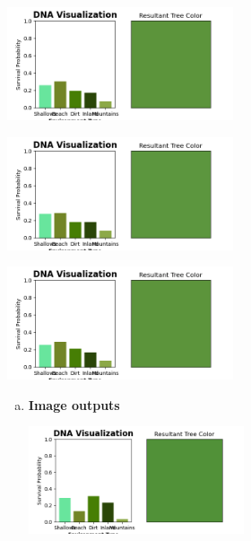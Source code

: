 \documentclass[11pt]{article}
\begin{document}

\begin{problems}
    \item \begin{problem}

        \begin{center}
        \includegraphics[width=0.5\textwidth]{outputs/q2a_frame0.png}
        
        \includegraphics[width=0.5\textwidth]{outputs/q2a_frame15.png}
        
        \includegraphics[width=0.5\textwidth]{outputs/q2a_frame29.png}
        \end{center}
    \end{problem}
    \clearpage

    
    \item \begin{problem}

    \begin{enumerate}[(a)]
        \item \textbf{Image outputs}
        \begin{center}
        \includegraphics[width=0.5\textwidth]{outputs/q3b_frame0.png}
        

\end{center}
\end{enumerate}
\end{problem}
\end{problems}
\end{document}
